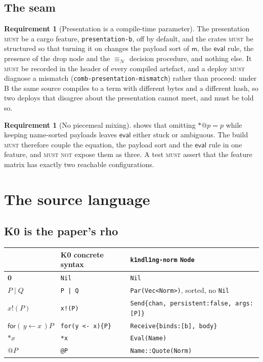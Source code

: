 \documentclass[11pt,a4paper]{article}
\makeatletter
\newcommand{\code}[1]{\texttt{#1}}
\newcommand{\MUST}{\textsc{must}}
\newcommand{\MUSTNOT}{\textsc{must not}}
\newcommand{\quo}[1]{@#1}
\newcommand{\drp}[1]{{*}#1}
\newcommand{\inp}[3]{\mathsf{for}(\,#1 \leftarrow #2\,)#3}
\newcommand{\out}[2]{#1!(#2)}
\newcommand{\nil}{\mathbf{0}}
\newcommand{\nequiv}{\equiv_{\mathcal{N}}}
\newcommand{\mm}{\mathsf{m}}
\theoremstyle{definition}
\newtheorem{requirement}[definition]{Requirement}
\theoremstyle{plain}
\makeatother
\begin{document}
\subsection{The seam}

\begin{requirement}[Presentation is a compile-time parameter]\label{req:pseam}
The presentation \MUST{} be a cargo feature, \code{presentation-b}, off by
default, and the crates \MUST{} be structured so that turning it on changes
the payload sort of $\mm$, the $\mathsf{eval}$ rule, the presence of the drop
node and the $\nequiv$ decision procedure, and nothing else. It \MUST{} be
recorded in the header of every compiled artefact, and a deploy \MUST{}
diagnose a mismatch (\code{comb-presentation-mismatch}) rather than proceed:
under B the same source compiles to a term with different bytes and a
different hash, so two deploys that disagree about the presentation cannot
meet, and must be told so.
\end{requirement}

\begin{requirement}[No piecemeal mixing]\label{req:nomix}
\cite[Rem.~3.2]{draft3} shows that omitting $\drp{\quo{p}} = p$ while keeping
name-sorted payloads leaves $\mathsf{eval}$ either stuck or ambiguous. The
build \MUST{} therefore couple the equation, the payload sort and the
$\mathsf{eval}$ rule in one feature, and \MUSTNOT{} expose them as three. A
test \MUST{} assert that the feature matrix has exactly two reachable
configurations.
\end{requirement}

\section{The source language}\label{sec:source}

\subsection{K0 is the paper's rho}

\begin{center}
\begin{tabular}{@{}lll@{}}
\toprule
\cite[Def.~2.1]{draft3} & K0 concrete syntax & \code{k1ndl1ng-norm} \code{Node}\\
\midrule
$\nil$ & \code{Nil} & \code{Nil}\\
$P \mid Q$ & \code{P | Q} & \code{Par(Vec<Norm>)}, sorted, no \code{Nil}\\
$\out{x}{P}$ & \code{x!(P)} & \code{Send\{chan, persistent:false, args:[P]\}}\\
$\inp{y}{x}{P}$ & \code{for(y <- x)\{P\}} & \code{Receive\{binds:[b], body\}}\\
$\drp{x}$ & \code{*x} & \code{Eval(Name)}\\
$\quo{P}$ & \code{@P} & \code{Name::Quote(Norm)}\\
\bottomrule
\end{tabular}
\end{center}
\end{document}
